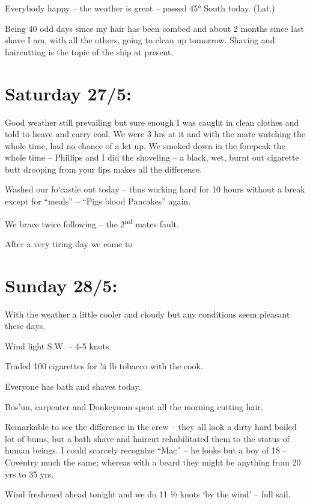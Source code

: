 \documentclass[
  11pt,
  msmallroyalvopaper
]{memoir}
\begin{document}
Everybody happy -- the weather is great -- passed 45° South today.
(Lat.)

Being 40 odd days since my hair has been combed and about 2 months since
last shave I am, with all the others, going to clean up tomorrow.
Shaving and haircutting is the topic of the ship at present.

\hypertarget{saturday-275}{%
\section{Saturday 27/5:}\label{saturday-275}}

Good weather still prevailing but sure enough I was caught in clean
clothes and told to heave and carry coal. We were 3 hrs at it and with
the mate watching the whole time, had no chance of a let up. We smoked
down in the forepeak the whole time -- Phillips and I did the shoveling
-- a black, wet, burnt out cigarette butt drooping from your lips makes
all the difference.

Washed our fo'castle out today -- thus working hard for 10 hours without
a break except for ``meals'' -- ``Pigs blood Pancakes'' again.

We brace twice following -- the 2\textsuperscript{nd} mates fault.

After a very tiring day we come to

\hypertarget{sunday-285}{%
\section{Sunday 28/5:}\label{sunday-285}}

With the weather a little cooler and cloudy but any conditions seem
pleasant these days.

Wind light S.W. -- 4-5 knots.

Traded 100 cigarettes for ¼ lb tobacco with the cook.

Everyone has bath and shaves today.

Bos'un, carpenter and Donkeyman spent all the morning cutting hair.

Remarkable to see the difference in the crew -- they all look a dirty
hard boiled lot of bums, but a bath shave and haircut rehabilitated them
to the status of human beings. I could scarcely recognize ``Mac'' -- he
looks but a boy of 18 -- Coventry much the same; whereas with a beard
they might be anything from 20 yrs to 35 yrs.

Wind freshened ahead tonight and we do 11 ½ knots `by the wind' -- full
sail.
\end{document}
